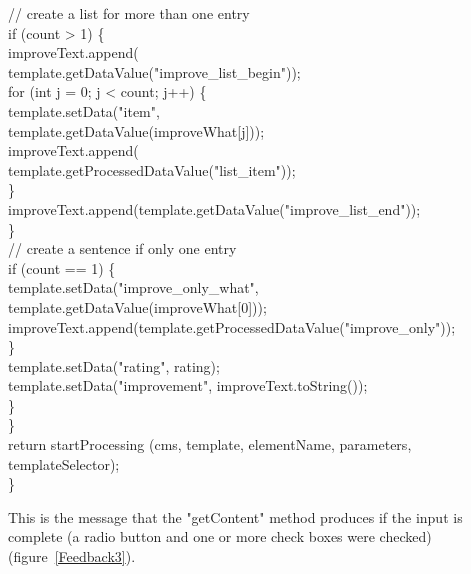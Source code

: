 \begin{java}
\jtabc                        // create a list for more than one entry\\
\jtabc                        if (count > 1) \{\\
\jtabd                           improveText.append(\\
\jtabf					template.getDataValue("improve\_list\_begin"));\\
\jtabd                           for (int j = 0; j < count; j++) \{\\
\jtabd                             template.setData("item",\\ 
\jtabf					template.getDataValue(improveWhat[j]));\\
\jtabe                             improveText.append(\\
\jtabf					template.getProcessedDataValue("list\_item"));\\
\jtabd                          \}\\
\jtabd			      improveText.append(template.getDataValue("improve\_list\_end"));\\
\jtabc                        \}\\
\jtabc                        // create a sentence if only one entry\\
\jtabc                        if (count == 1) \{\\
\jtabd				template.setData("improve\_only\_what",\\
\jtabd				template.getDataValue(improveWhat[0]));\\
\jtabd				improveText.append(template.getProcessedDataValue("improve\_only"));\\
\jtabc                        \}\\
\jtabc                        template.setData("rating", rating);\\
\jtabc                        template.setData("improvement", improveText.toString());\\
\jtabb                \}\\
\jtaba        \}\\
\jtaba        return startProcessing (cms, template, elementName, parameters, templateSelector);\\
\}\\
\end{java}

This is the message that the {\meth "getContent"} method produces if the input
is complete (a radio button and one or more check boxes were checked)
(figure~\ref{Feedback3}).

